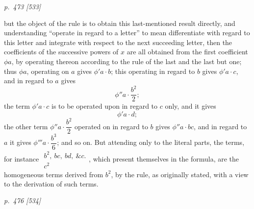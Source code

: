 \documentclass[11pt,a4paper]{article}
\theoremstyle{plain}
\theoremstyle{definition}
\newcommand{\amp}{\&c.}
\begin{document}
\clearpage

\bigskip
\textit{p.~473 [533]}
\smallskip

\noindent

but the object of the rule is to obtain this last-mentioned result directly, and understanding
``operate in regard to a letter'' to mean differentiate with regard to this letter and integrate
with respect to the next succeeding letter, then the coefficients of the successive powers of
\(x\) are all obtained from the first coefficient \(\phi a\), by operating thereon according to
the rule of the last and the last but one; thus \(\phi a\), operating on \(a\) gives
\(\phi'a\cdot b\); this operating in regard to \(b\) gives \(\phi'a\cdot c\), and in regard to
\(a\) gives
\[
\phi''a\cdot\frac{b^{2}}{2};
\]
the term \(\phi'a\cdot c\) is to be operated upon in regard to \(c\) only, and it gives
\[
\phi'a\cdot d;
\]
the other term \(\phi''a\cdot\dfrac{b^{2}}{2}\) operated on in regard to \(b\) gives
\(\phi''a\cdot bc\), and in regard to \(a\) it gives \(\phi'''a\cdot\dfrac{b^{3}}{6}\);
and so on. But attending only to the literal parts, the terms, for instance
\(\begin{gathered} b^{2},\ bc,\ bd,\ \amp\\ c^{2}\end{gathered}\), which present themselves
in the formula, are the homogeneous terms derived from \(b^{2}\), by the rule, as originally
stated, with a view to the derivation of such terms.

\clearpage

\bigskip
\textit{p.~476 [534]}
\smallskip
\end{document}
